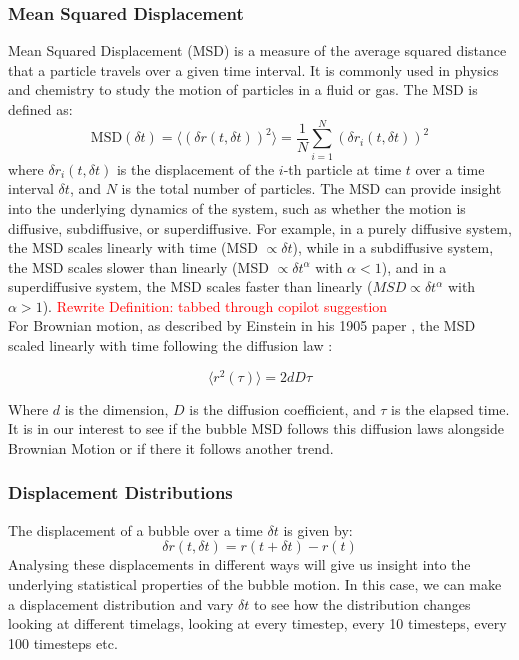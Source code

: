\subsubsection{Mean Squared Displacement}
Mean Squared Displacement (MSD) is a measure of the average squared distance that a particle travels over a given time interval. It is commonly used in physics and chemistry to study the motion of particles in a fluid or gas. The MSD is defined as:
\begin{equation}
    \text{MSD}(\delta t) = \langle (\delta r(t, \delta t))^2 \rangle = \frac{1}{N} \sum_{i=1}^{N} (\delta r_i(t, \delta t))^2
\end{equation}
where $\delta r_i(t, \delta t)$ is the displacement of the $i$-th particle at time $t$ over a time interval $\delta t$, and $N$ is the total number of particles. The MSD can provide insight into the underlying dynamics of the system, such as whether the motion is diffusive, subdiffusive, or superdiffusive. For example, in a purely diffusive system, the MSD scales linearly with time (MSD $\propto \delta t$), while in a subdiffusive system, the MSD scales slower than linearly (MSD $\propto \delta t^\alpha$ with $\alpha < 1$), and in a superdiffusive system, the MSD scales faster than linearly ($MSD \propto \delta t^\alpha$ with $\alpha > 1$). \textcolor{red}{Rewrite Definition: tabbed through copilot suggestion}\\

For Brownian motion, as described by Einstein in his 1905 paper , the MSD scaled linearly with time following the diffusion law \cite{EinsteinMSD}:

\begin{equation}
    \langle r^2 (\tau) \rangle = 2dD\tau
\end{equation}

Where $d$ is the dimension, $D$ is the diffusion coefficient, and $\tau$ is the elapsed time. It is in our interest to see if the bubble MSD follows this diffusion laws alongside Brownian Motion or if there it follows another trend.


\subsubsection{Displacement Distributions}
The displacement of a bubble over a time $\delta t$ is given by:
\begin{equation}
    \delta r(t, \delta t) = r(t+\delta t) - r(t)
\end{equation}
Analysing these displacements in different ways will give us insight into the underlying statistical properties of the bubble motion. In this case, we can make a displacement distribution and vary $\delta t$ to see how the distribution changes looking at different timelags, looking at every timestep, every 10 timesteps, every 100 timesteps etc.\\


